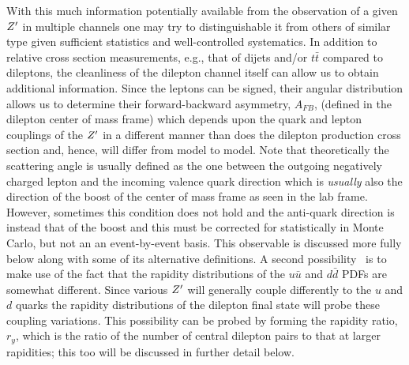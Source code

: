 \documentclass[a4paper,11pt]{article}
\begin{document}
With this much information potentially available from the observation of a given $Z^{\prime}$ in multiple channels one may try to distinguishable it from others of similar type given
sufficient statistics and
well-controlled systematics. In addition to relative cross section measurements,  e.g., that of dijets and/or $t\bar t$ compared to dileptons, the cleanliness of the dilepton channel itself
can allow us to obtain additional information.  Since the leptons can be signed, their angular distribution allows us to determine their forward-backward asymmetry, $A_{FB}$, (defined in the
dilepton center of mass frame) which depends upon the quark and lepton couplings of the $Z^{\prime}$ in a different manner than does the dilepton production cross section and, hence, will
differ from model to model. Note that theoretically the scattering angle is usually defined as the one between the outgoing negatively charged lepton and the incoming valence quark direction which is {\it usually} also the direction of the boost of the center of mass frame as seen in the lab frame. However, sometimes this condition does not hold and the anti-quark direction is
instead that of the boost and this must be corrected for statistically in Monte Carlo, but not an an event-by-event basis. This observable is discussed more fully below along with some of its
alternative definitions. A second possibility~\cite{delAguila:1993ym} is to make use of the fact
that the rapidity distributions of the $u\bar u$ and $d\bar d$ PDFs are somewhat different. Since various $Z^{\prime}$ will generally couple differently to the  $u$ and $d$ quarks the
rapidity distributions of the dilepton final state will probe these coupling variations. This possibility can be probed by forming the rapidity ratio, $r_y$, which is the ratio of the number of
central dilepton pairs to that at larger rapidities; this too will be discussed in further detail below.
\end{document}
